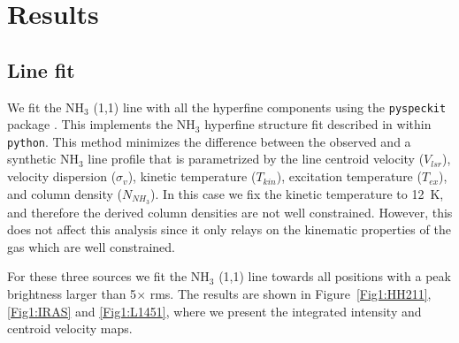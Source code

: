 \section{Results}

\subsection{Line fit}
We fit the NH$_3$ (1,1) line with all the hyperfine components using the \verb+pyspeckit+ package \cite{2011ascl.soft09001G}. 
This implements the NH$_3$ hyperfine structure fit described in \cite{Rosolowsky_2008} within \verb+python+.
This method minimizes the difference between the observed and a synthetic NH$_3$ line profile 
that is parametrized by the line centroid velocity ($V_{lsr}$), velocity dispersion ($\sigma_v$), 
kinetic temperature ($T_{kin}$), excitation temperature ($T_{ex}$), and column density ($N_{NH_3}$).
In this case we fix the kinetic temperature to 12~K, and therefore the derived column densities are not 
well constrained. 
However, this does not affect this analysis since it only relays on the kinematic properties of the gas 
which are well constrained.

For these three sources we fit the NH$_3$ (1,1) line towards all positions with a peak brightness larger than
5$\times$ rms. 
The results are shown in Figure~\ref{Fig1:HH211}, \ref{Fig1:IRAS} and \ref{Fig1:L1451}, where we 
present the integrated intensity and centroid velocity maps.
